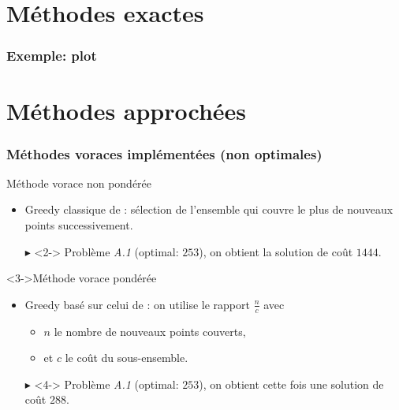 \documentclass[aspectratio=169,11pt]{beamer}
\begin{document}
	\section{Méthodes exactes}

	\begin{frame}
		\frametitle{Exemple: plot}
		\centering
	\end{frame}

	\section{Méthodes approchées}

	\begin{frame}
		\frametitle{Méthodes voraces implémentées (non optimales)}
		\begin{block}{Méthode vorace non pondérée}
			\begin{itemize}
				\item Greedy classique de \citeauthor{Johnson:1973:AAC:800125.804034}: sélection de l'ensemble qui couvre le plus de nouveaux points successivement.
				\item[\alert{\(\blacktriangleright\)}]<2-> Problème \emph{A.1} (optimal: \(253\)), on obtient la solution de coût \alert{\(1444\)}.
			\end{itemize}
		\end{block}
		\begin{block}<3->{Méthode vorace pondérée}
			\begin{itemize}
				\item Greedy basé sur celui de \citeauthor{Johnson:1973:AAC:800125.804034}: on utilise le rapport \(\frac{n}{c}\) avec
					\begin{itemize}
						\item \(n\) le nombre de nouveaux points couverts,
						\item et \(c\) le coût du sous-ensemble.
					\end{itemize}
				\item[\alert{\(\blacktriangleright\)}]<4-> Problème \emph{A.1} (optimal: \(253\)), on obtient cette fois une solution de coût \alert{\(288\)}.
			\end{itemize}
		\end{block}
	\end{frame}

	\begin{frame}
		\centering
		
	\end{frame}
\end{document}

